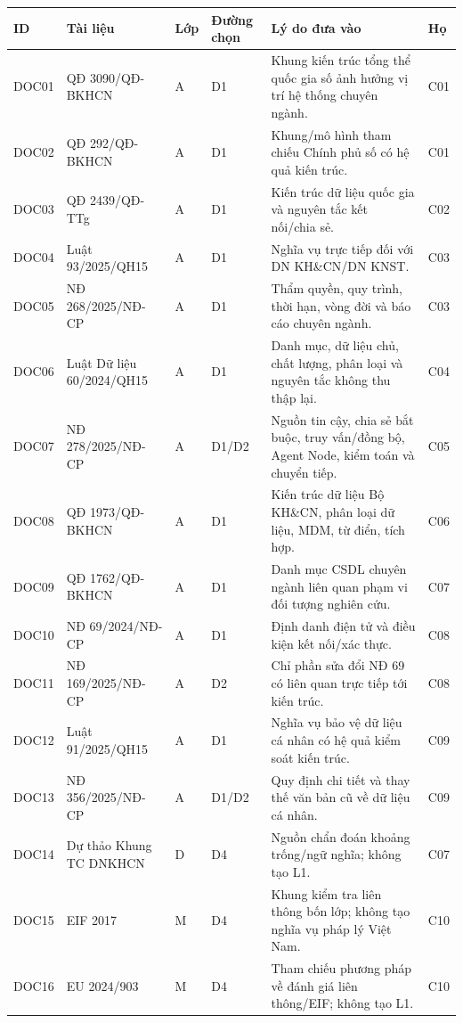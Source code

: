 \documentclass[10pt]{article}
\newcommand{\smallhead}[1]{\textbf{#1}}
\begin{document}
\vspace{4pt}
\small
\begin{tabularx}{\textwidth}{@{}p{1.1cm}p{3.4cm}p{1.0cm}p{2.1cm}Y p{1.2cm}@{}}
\toprule
\smallhead{ID} & \smallhead{Tài liệu} & \smallhead{Lớp} & \smallhead{Đường chọn} & \smallhead{Lý do đưa vào} & \smallhead{Họ} \\
\midrule
DOC01 & QĐ 3090/QĐ-BKHCN & A & D1 & Khung kiến trúc tổng thể quốc gia số ảnh hưởng vị trí hệ thống chuyên ngành. & C01 \\
DOC02 & QĐ 292/QĐ-BKHCN & A & D1 & Khung/mô hình tham chiếu Chính phủ số có hệ quả kiến trúc. & C01 \\
DOC03 & QĐ 2439/QĐ-TTg & A & D1 & Kiến trúc dữ liệu quốc gia và nguyên tắc kết nối/chia sẻ. & C02 \\
DOC04 & Luật 93/2025/QH15 & A & D1 & Nghĩa vụ trực tiếp đối với DN KH\&CN/DN KNST. & C03 \\
DOC05 & NĐ 268/2025/NĐ-CP & A & D1 & Thẩm quyền, quy trình, thời hạn, vòng đời và báo cáo chuyên ngành. & C03 \\
DOC06 & Luật Dữ liệu 60/2024/QH15 & A & D1 & Danh mục, dữ liệu chủ, chất lượng, phân loại và nguyên tắc không thu thập lại. & C04 \\
DOC07 & NĐ 278/2025/NĐ-CP & A & D1/D2 & Nguồn tin cậy, chia sẻ bắt buộc, truy vấn/đồng bộ, Agent Node, kiểm toán và chuyển tiếp. & C05 \\
DOC08 & QĐ 1973/QĐ-BKHCN & A & D1 & Kiến trúc dữ liệu Bộ KH\&CN, phân loại dữ liệu, MDM, từ điển, tích hợp. & C06 \\
DOC09 & QĐ 1762/QĐ-BKHCN & A & D1 & Danh mục CSDL chuyên ngành liên quan phạm vi đối tượng nghiên cứu. & C07 \\
DOC10 & NĐ 69/2024/NĐ-CP & A & D1 & Định danh điện tử và điều kiện kết nối/xác thực. & C08 \\
DOC11 & NĐ 169/2025/NĐ-CP & A & D2 & Chỉ phần sửa đổi NĐ 69 có liên quan trực tiếp tới kiến trúc. & C08 \\
DOC12 & Luật 91/2025/QH15 & A & D1 & Nghĩa vụ bảo vệ dữ liệu cá nhân có hệ quả kiểm soát kiến trúc. & C09 \\
DOC13 & NĐ 356/2025/NĐ-CP & A & D1/D2 & Quy định chi tiết và thay thế văn bản cũ về dữ liệu cá nhân. & C09 \\
DOC14 & Dự thảo Khung TC DNKHCN & D & D4 & Nguồn chẩn đoán khoảng trống/ngữ nghĩa; không tạo L1. & C07 \\
DOC15 & EIF 2017 & M & D4 & Khung kiểm tra liên thông bốn lớp; không tạo nghĩa vụ pháp lý Việt Nam. & C10 \\
DOC16 & EU 2024/903 & M & D4 & Tham chiếu phương pháp về đánh giá liên thông/EIF; không tạo L1. & C10 \\
\bottomrule
\end{tabularx}
\normalsize
\end{document}
